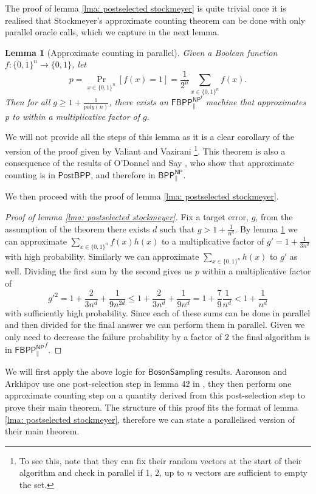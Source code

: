 \documentclass{article}
\newtheorem{lemma}[theorem]{Lemma}
\begin{document}
The proof of lemma \ref{lma: postselected stockmeyer} is quite trivial once it is realised that Stockmeyer's approximate counting theorem can be done with only parallel oracle calls, which we capture in the next lemma.


\begin{lemma}[Approximate counting in parallel]\label{lma:better stockmeyer}
    Given a Boolean function $f:\{0,1\}^n\rightarrow \{0,1\}$, let
    \[
    p=\Pr_{x\in \{0,1\}^n}[f(x)=1]=\frac{1}{2^n} \sum_{x\in \{ 0 ,1 \}^n}f(x).
    \]
    Then for all $g\geq 1+ \frac{1}{poly(n)}$, there exists an $\mathsf{FBPP_{\parallel}^{NP^f}}$ machine that approximates p to within a multiplicative factor of $g.$
\end{lemma}

We will not provide all the steps of this lemma as it is a clear corollary of the version of the proof given by Valiant and Vazirani \cite{valiant1985np}\footnote{To see this, note that they can fix their random vectors at the start of their algorithm and check in parallel if 1, 2, up to $n$ vectors are sufficient to empty the set.}. This theorem is also a consequence of the results of O'Donnel and Say \cite{o2018weakness}, who show that approximate counting is in $\mathsf{PostBPP}$, and therefore in $\mathsf{BPP^{NP}_{\parallel}}$.

We then proceed with the proof of lemma \ref{lma: postselected stockmeyer}.

\begin{proof}[Proof of lemma \ref{lma: postselected stockmeyer}]
    Fix a target error, $g$, from the assumption of the theorem there exists $d$ such that $g>1+\frac{1}{n^d}$. By lemma \ref{lma:better stockmeyer} we can approximate $\sum_{x\in \{ 0 ,1 \}^n}f(x)h(x)$ to a multiplicative factor of ${g'}=1+\frac{1}{3n^d}$ with high probability. Similarly we can approximate $\sum_{x\in \{ 0 ,1 \}^n}h(x)$ to ${g'}$ as well. Dividing the first sum by the second gives us $p$ within a multiplicative factor of 
    \[
    {g'}^2 = 1+\frac{2}{3n^d}+\frac{1}{9n^{2d}} \leq 
    1+\frac{2}{3n^d}+\frac{1}{9n^{d}} = 1+\frac{7}{9}\frac{1}{n^d} < 1+\frac{1}{n^d}
    \]
with sufficiently high probability. Since each of these sums can be done in parallel and then divided for the final answer we can perform them in parallel. Given we only need to decrease the failure probability by a factor of 2 the final algorithm is in $\mathsf{FBPP^{NP}_{\parallel}}^f$.
\end{proof}

We will first apply the above logic for $\mathsf{BosonSampling}$ results.
Aaronson and Arkhipov use one post-selection step in lemma 42 in \cite{aaronson2011computational}, they then perform one approximate counting step on a quantity derived from this post-selection step to prove their main theorem. The structure of this proof fits the format of lemma \ref{lma: postselected stockmeyer}, therefore we can state a parallelised version of their main theorem.
\end{document}
